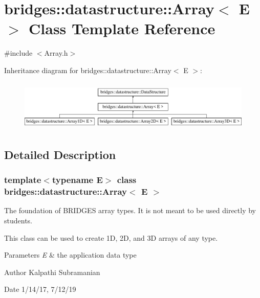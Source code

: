 \hypertarget{classbridges_1_1datastructure_1_1_array}{}\section{bridges\+:\+:datastructure\+:\+:Array$<$ E $>$ Class Template Reference}
\label{classbridges_1_1datastructure_1_1_array}


{\ttfamily \#include $<$Array.\+h$>$}

Inheritance diagram for bridges\+:\+:datastructure\+:\+:Array$<$ E $>$\+:\begin{figure}[H]
\begin{center}
\leavevmode
\includegraphics[height=2.445415cm]{classbridges_1_1datastructure_1_1_array}
\end{center}
\end{figure}


\subsection{Detailed Description}
\subsubsection*{template$<$typename E$>$\newline
class bridges\+::datastructure\+::\+Array$<$ E $>$}

The foundation of B\+R\+I\+D\+G\+ES array types. It is not meant to be used directly by students. 

This class can be used to create 1D, 2D, and 3D arrays of any type.


\begin{DoxyParams}{Parameters}
{\em E} & the application data type\\
\hline
\end{DoxyParams}
\begin{DoxyAuthor}{Author}
Kalpathi Subramanian 
\end{DoxyAuthor}
\begin{DoxyDate}{Date}
1/14/17, 7/12/19 
\end{DoxyDate}
